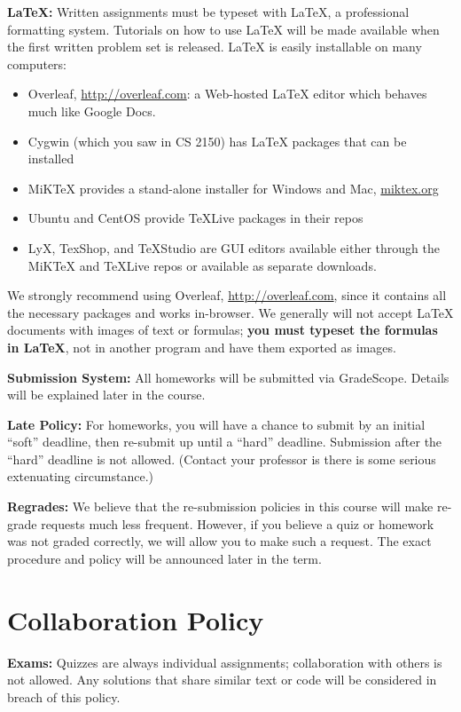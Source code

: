 \documentclass[12pt]{article}
\begin{document}
\textbf{\LaTeX:} Written assignments must be typeset with \LaTeX, a professional formatting system. Tutorials on how to use \LaTeX{} will be made available when the first written problem set is released. \LaTeX{} is easily installable on many computers: 
\begin{itemize}
    \item Overleaf, \url{http://overleaf.com}: a Web-hosted \LaTeX{} editor which behaves much like Google Docs.
    \item Cygwin (which you saw in CS 2150) has \LaTeX{} packages that can be installed
    \item MiKTeX provides a stand-alone installer for Windows and Mac, \url{miktex.org}
    \item Ubuntu and CentOS provide TeXLive packages in their repos
    \item LyX, TexShop, and TeXStudio are GUI editors available either through the MiKTeX and TeXLive repos or available as separate downloads.
\end{itemize}
We strongly recommend using Overleaf, \url{http://overleaf.com}, since it contains all the necessary packages and works in-browser. We generally will not accept \LaTeX{} documents with images of text or formulas; \textbf{you must typeset the formulas in \LaTeX}, not in another program and have them exported as images.

\textbf{Submission System:} All homeworks will be submitted via GradeScope. Details will be explained later in the course. 

\textbf{Late Policy:} For homeworks, you will have a chance to submit by an initial ``soft'' deadline, then re-submit up until a ``hard'' deadline. Submission after the ``hard'' deadline is not allowed. (Contact your professor is there is some serious extenuating circumstance.)

\textbf{Regrades:} We believe that the re-submission policies in this course will make re-grade requests much less frequent.  However, if you believe a quiz or homework was not graded correctly, we will allow you to make such a request. The exact procedure and policy will be announced later in the term.

\section*{Collaboration Policy}

\textbf{Exams:} Quizzes are always individual assignments; collaboration with others is not allowed.  Any solutions that share similar text or code will be considered in breach of this policy.
\end{document}
